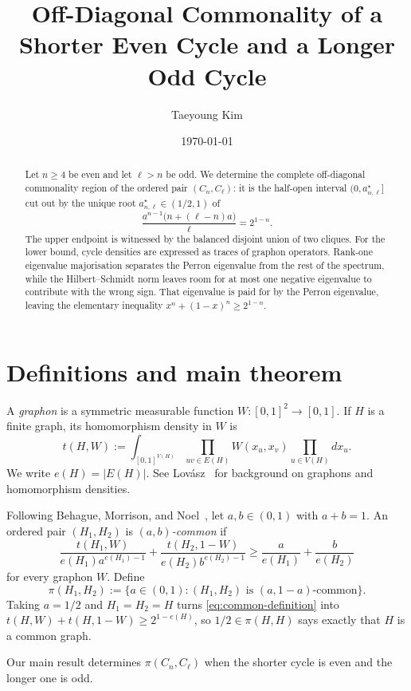 \documentclass[11pt]{article}
\title{Off-Diagonal Commonality of a Shorter Even Cycle and a Longer Odd Cycle}
\author{Taeyoung Kim}
\date{\today}
\theoremstyle{definition}
\theoremstyle{remark}
\begin{document}
\maketitle

\begin{abstract}
Let $n\ge4$ be even and let $\ell>n$ be odd.  We determine the complete
off-diagonal commonality region of the ordered pair $(C_n,C_\ell)$: it is the
half-open interval $(0,a_{n,\ell}^{\star}]$ cut out by the unique root
$a_{n,\ell}^{\star}\in(1/2,1)$ of
\[
  \frac{a^{n-1}\bigl(n+(\ell-n)a\bigr)}{\ell}=2^{1-n}.
\]
The upper endpoint is witnessed by the balanced disjoint union of two cliques.
For the lower bound, cycle densities are expressed as traces of graphon
operators.  Rank-one eigenvalue majorisation separates the Perron eigenvalue
from the rest of the spectrum, while the Hilbert--Schmidt norm leaves room for
at most one negative eigenvalue to contribute with the wrong sign.  That
eigenvalue is paid for by the Perron eigenvalue, leaving the elementary
inequality $x^{n}+(1-x)^{n}\ge2^{1-n}$.
\end{abstract}

\section{Definitions and main theorem}

A \emph{graphon} is a symmetric measurable function
$W\colon[0,1]^2\to[0,1]$.  If $H$ is a finite graph, its homomorphism density
in $W$ is
\[
  t(H,W)
  :=
  \int_{[0,1]^{V(H)}}
  \prod_{uv\in E(H)}W(x_u,x_v)
  \prod_{u\in V(H)}dx_u.
\]
We write $e(H)=|E(H)|$.  See Lov\'asz~\cite{Lovasz} for background on
graphons and homomorphism densities.

Following Behague, Morrison, and Noel~\cite{BMN}, let $a,b\in(0,1)$ with
$a+b=1$.  An ordered pair $(H_1,H_2)$ is \emph{$(a,b)$-common} if
\begin{equation}
  \frac{t(H_1,W)}{e(H_1)a^{e(H_1)-1}}
  +
  \frac{t(H_2,1-W)}{e(H_2)b^{e(H_2)-1}}
  \ge
  \frac{a}{e(H_1)}+\frac{b}{e(H_2)}
  \label{eq:common-definition}
\end{equation}
for every graphon $W$.  Define
\[
  \pi(H_1,H_2)
  :=
  \{a\in(0,1):(H_1,H_2)\text{ is }(a,1-a)\text{-common}\}.
\]
Taking $a=1/2$ and $H_1=H_2=H$ turns \eqref{eq:common-definition} into
$t(H,W)+t(H,1-W)\ge2^{1-e(H)}$, so $1/2\in\pi(H,H)$ says exactly that $H$ is
a common graph.

Our main result determines $\pi(C_n,C_\ell)$ when the shorter cycle is even
and the longer one is odd.
\end{document}

